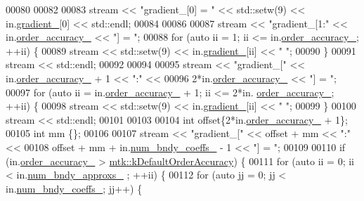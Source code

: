\begin{DoxyCode}
00080 
00082 
00083   stream << \textcolor{stringliteral}{"gradient\_[0] = "} << std::setw(9) << in.\hyperlink{classmtk_1_1Grad1D_a024b84b1ea285c0c590eb42d40ff4469}{gradient\_}[0] << std::endl;
00084 
00086 
00087   stream << \textcolor{stringliteral}{"gradient\_[1:"} << in.\hyperlink{classmtk_1_1Grad1D_a545e9c865e5d4716f2684a64f744c78c}{order\_accuracy\_} << \textcolor{stringliteral}{"] = "};
00088   \textcolor{keywordflow}{for} (\textcolor{keyword}{auto} ii = 1; ii <= in.\hyperlink{classmtk_1_1Grad1D_a545e9c865e5d4716f2684a64f744c78c}{order\_accuracy\_}; ++ii) \{
00089     stream << std::setw(9) << in.\hyperlink{classmtk_1_1Grad1D_a024b84b1ea285c0c590eb42d40ff4469}{gradient\_}[ii] << \textcolor{stringliteral}{" "};
00090   \}
00091   stream << std::endl;
00092 
00094 
00095   stream << \textcolor{stringliteral}{"gradient\_["} << in.\hyperlink{classmtk_1_1Grad1D_a545e9c865e5d4716f2684a64f744c78c}{order\_accuracy\_} + 1 << \textcolor{stringliteral}{":"} <<
00096     2*in.\hyperlink{classmtk_1_1Grad1D_a545e9c865e5d4716f2684a64f744c78c}{order\_accuracy\_} << \textcolor{stringliteral}{"] = "};
00097   \textcolor{keywordflow}{for} (\textcolor{keyword}{auto} ii = in.\hyperlink{classmtk_1_1Grad1D_a545e9c865e5d4716f2684a64f744c78c}{order\_accuracy\_} + 1; ii <= 2*in.
      \hyperlink{classmtk_1_1Grad1D_a545e9c865e5d4716f2684a64f744c78c}{order\_accuracy\_}; ++ii) \{
00098     stream << std::setw(9) << in.\hyperlink{classmtk_1_1Grad1D_a024b84b1ea285c0c590eb42d40ff4469}{gradient\_}[ii] << \textcolor{stringliteral}{" "};
00099   \}
00100   stream << std::endl;
00101 
00103 
00104   \textcolor{keywordtype}{int} offset\{2*in.\hyperlink{classmtk_1_1Grad1D_a545e9c865e5d4716f2684a64f744c78c}{order\_accuracy\_} + 1\};
00105   \textcolor{keywordtype}{int} mm \{\};
00106 
00107   stream << \textcolor{stringliteral}{"gradient\_["} << offset + mm << \textcolor{stringliteral}{":"} <<
00108     offset + mm + in.\hyperlink{classmtk_1_1Grad1D_a60c560882bc601f9ab1d4cd5331e55ef}{num\_bndy\_coeffs\_} - 1 << \textcolor{stringliteral}{"] = "};
00109 
00110   \textcolor{keywordflow}{if} (in.\hyperlink{classmtk_1_1Grad1D_a545e9c865e5d4716f2684a64f744c78c}{order\_accuracy\_} > \hyperlink{group__c01-roots_ga0d95560098eb36420511103637b6952f}{mtk::kDefaultOrderAccuracy}) \{
00111     \textcolor{keywordflow}{for} (\textcolor{keyword}{auto} ii = 0; ii < in.\hyperlink{classmtk_1_1Grad1D_abe15c1ffd9dfaba1a65f4f0e096287ce}{num\_bndy\_approxs\_} ; ++ii) \{
00112       \textcolor{keywordflow}{for} (\textcolor{keyword}{auto} jj = 0; jj < in.\hyperlink{classmtk_1_1Grad1D_a60c560882bc601f9ab1d4cd5331e55ef}{num\_bndy\_coeffs\_}; jj++) \{

\end{DoxyCode}
